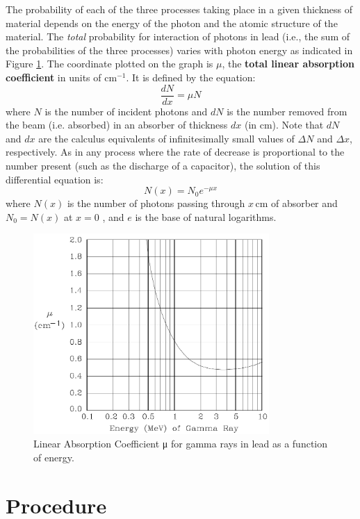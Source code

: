The probability of each of the three processes taking place in a given thickness of material depends on the energy of the photon and the atomic structure of the material. The \emph{total} probability for interaction of photons in lead (i.e., the sum of the probabilities of the three processes) varies with photon energy as indicated in Figure {\ref{fig:linear}}. The coordinate plotted on the graph is $\mu$, the \textbf{total linear absorption coefficient} in units of $\mathrm{cm}^{-1}$. It is defined by the equation:
\begin{equation}
  \frac{d N}{d x}=\mu N
\end{equation}
where $N$ is the number of incident photons and $dN$ is the number removed from the beam (i.e. absorbed) in an absorber of thickness $dx$ (in cm). Note that $dN$ and $dx$ are the calculus equivalents of infinitesimally small values of $\Delta N$ and $\Delta x$, respectively. As in any process where the rate of decrease is proportional to the number present (such as the discharge of a capacitor), the solution of this differential equation is:
\begin{equation}
  N(x)=N_{0}e^{-\mu x}
\label{eq:nx}
\end{equation}
where $N(x)$ is the number of photons passing through $x\,\mathrm{cm}$ of absorber and $N_0=N(x)$ at $x = 0$ , and $e$ is the base of natural logarithms.
\begin{figure}[h]
\centering
\includegraphics[width=0.8\textwidth]{./Exp10/pic/image6.png}
\caption{Linear Absorption Coefficient μ for gamma rays in lead as a function of energy.}
\label{fig:linear}
\end{figure}

\section{Procedure}
